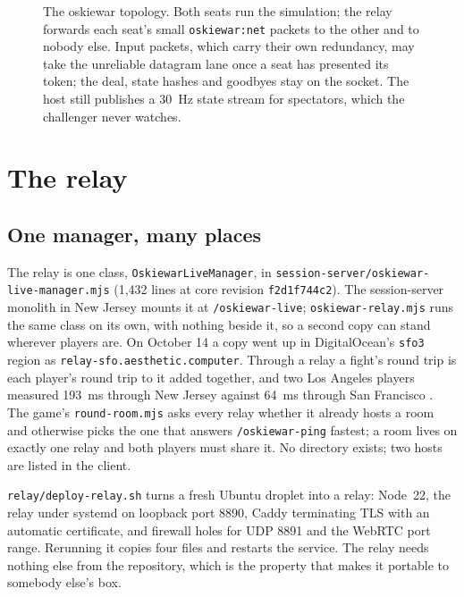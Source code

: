 \documentclass[10pt,letterpaper,twocolumn]{article}
\newcommand{\code}[1]{\texttt{\nolinkurl{#1}}}
\begin{document}
\begin{figure}[t]
\caption{The oskiewar topology. Both seats run the simulation; the relay forwards each seat's small \code{oskiewar:net} packets to the other and to nobody else. Input packets, which carry their own redundancy, may take the unreliable datagram lane once a seat has presented its token; the deal, state hashes and goodbyes stay on the socket. The host still publishes a 30~Hz state stream for spectators, which the challenger never watches.}
\label{fig:topology}
\end{figure}

\section{The relay}\label{sec:relay}
\subsection{One manager, many places}
The relay is one class, \code{OskiewarLiveManager}, in \code{session-server/oskiewar-live-manager.mjs} (1,432 lines at core revision \code{f2d1f744c2}). The session-server monolith in New Jersey mounts it at \code{/oskiewar-live}; \code{oskiewar-relay.mjs} runs the same class on its own, with nothing beside it, so a second copy can stand wherever players are. On October 14 a copy went up in DigitalOcean's \code{sfo3} region as \code{relay-sfo.aesthetic.computer}. Through a relay a fight's round trip is each player's round trip to it added together, and two Los Angeles players measured 193~ms through New Jersey against 64~ms through San Francisco \citep{westcoast}. The game's \code{round-room.mjs} asks every relay whether it already hosts a room and otherwise picks the one that answers \code{/oskiewar-ping} fastest; a room lives on exactly one relay and both players must share it. No directory exists; two hosts are listed in the client.

\code{relay/deploy-relay.sh} turns a fresh Ubuntu droplet into a relay: Node~22, the relay under systemd on loopback port 8890, Caddy terminating TLS with an automatic certificate, and firewall holes for UDP 8891 and the WebRTC port range. Rerunning it copies four files and restarts the service. The relay needs nothing else from the repository, which is the property that makes it portable to somebody else's box.
\end{document}

